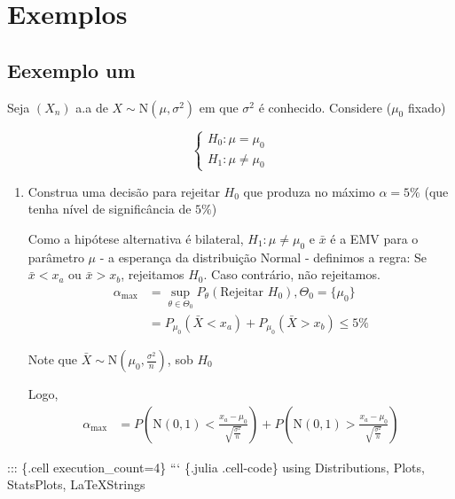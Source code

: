 \documentclass[
  letterpaper,
  DIV=11,
  numbers=noendperiod]{scrreprt}
\begin{document}
\section{Exemplos}\label{exemplos-2}

\subsection{Eexemplo um}\label{eexemplo-um}

Seja \((X_{n})\) a.a de \(X\sim \mathrm{N}(\mu,\sigma^2)\) em que
\(\sigma^2\) é conhecido. Considere (\(\mu_{0}\) fixado)

\[
\begin{cases}
H_{0} : \mu = \mu_{0} \\
H_{1}: \mu \neq \mu_{0}
\end{cases}
\]

\begin{enumerate}
\def\labelenumi{\arabic{enumi}.}
\item
  Construa uma decisão para rejeitar \(H_0\) que produza no máximo
  \(\alpha = 5\%\) (que tenha nível de significância de \(5\%\))

  Como a hipótese alternativa é bilateral, \(H_{1}:\mu\neq \mu_{0}\) e
  \(\bar{x}\) é a EMV para o parâmetro \(\mu\) - a esperança da
  distribuição Normal - definimos a regra: Se \(\bar{x}< x_{a}\) ou
  \(\bar{x}> x_{b}\), rejeitamos \(H_{0}\). Caso contrário, não
  rejeitamos. \[
   \begin{aligned}
       \alpha_{\max} &= \sup_{\theta \in \Theta_{0}} P_{\theta}(\text{Rejeitar }H_{0}), \Theta_{0} = \{ \mu_{0} \} \\
       &= P_{\mu_{0}}(\bar{X}<x_{a}) + P_{\mu_{0}}(\bar{X}>x_{b}) \leq 5\%
   \end{aligned}
   \]

  Note que
  \(\bar{X} \sim \mathrm{N}\left(\mu_{0}, \frac{\sigma^{2}}{n} \right)\),
  sob \(H_{0}\)

  Logo, \[
   \begin{aligned}
       \alpha_{\max} &= P\left( \mathrm{N}(0,1) < \frac{{x_{a}-\mu_{0}}}{\sqrt{ \frac{\sigma^2}{n} }} \right)+
   P\left( \mathrm{N}(0,1) > \frac{{x_{a}-\mu_{0}}}{\sqrt{ \frac{\sigma^2}{n} }} \right)
   \end{aligned}
   \]
\end{enumerate}

::: \{.cell execution\_count=4\} ``` \{.julia .cell-code\} using
Distributions, Plots, StatsPlots, LaTeXStrings
\end{document}
